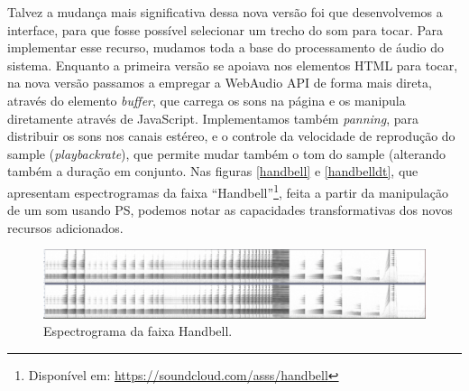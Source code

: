  Talvez a mudança mais significativa dessa nova versão foi que desenvolvemos a interface, para que fosse possível selecionar um trecho do som para tocar. Para implementar esse recurso, mudamos toda a base do processamento de áudio do sistema. Enquanto a primeira versão se apoiava nos elementos HTML para tocar, na nova versão passamos a empregar a WebAudio API de forma mais direta, através do elemento \emph{buffer}, que carrega os sons na página e os manipula diretamente através de JavaScript. Implementamos também \emph{panning}, para distribuir os sons nos canais estéreo, e o controle da velocidade de reprodução do sample (\emph{playbackrate}), que permite mudar também o tom do sample (alterando também a duração em conjunto. Nas figuras \ref{handbell} e \ref{handbelldt}, que apresentam espectrogramas da faixa ``Handbell''\footnote{Disponível em: \url{https://soundcloud.com/asss/handbell}}, feita a partir da manipulação de um som usando PS, podemos notar as capacidades transformativas dos novos recursos adicionados. 



\begin{figure}

\includegraphics[width=1\textwidth]{pictures/cap4/handbellreverse}
\caption{\label{handbell}Espectrograma da faixa Handbell.}
\label{fig:handbell}
\end{figure}








